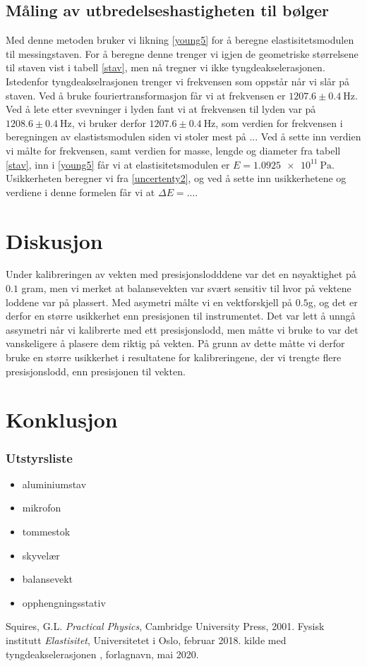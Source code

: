 \documentclass[%
 reprint,
 amsmath,amssymb,
 aps,
]{revtex4-1}
\begin{document}
\subsection{Måling av utbredelseshastigheten til bølger}
Med denne metoden bruker vi likning \eqref{young5} for å beregne elastisitetsmodulen til messingstaven. For å beregne denne trenger vi igjen de geometriske størrelsene til staven vist i tabell \vref{stav}, men nå tregner vi ikke tyngdeakselerasjonen. Istedenfor tyngdeakselrasjonen trenger vi frekvensen som oppstår når vi slår på staven. Ved å bruke fouriertransformasjon får vi at frekvensen er $1207.6\pm\SI{0.4}{\hertz}$. Ved å lete etter svevninger i lyden fant vi at frekvensen til lyden var på $1208.6\pm\SI{0.4}{\hertz}$, vi bruker derfor $1207.6\pm\SI{0.4}{\hertz}$, som verdien for frekvensen i beregningen av elastistsmodulen siden vi stoler mest på ...
Ved å sette inn verdien vi målte for frekvensen, samt verdien for masse, lengde og diameter fra tabell \vref{stav}, inn i \eqref{young5} får vi at elastisitetsmodulen er $E = \SI{1.0925e11}{\pascal}$. Usikkerheten beregner vi fra \eqref{uncertenty2}, og ved å sette inn usikkerhetene og verdiene i denne formelen får vi at $\Delta E = ...$.
\section{Diskusjon}
Under kalibreringen av vekten med presisjonslodddene var det en nøyaktighet på $0.1$ gram, men vi merket at balansevekten var svært sensitiv til hvor på vektene loddene var på plassert. Med asymetri målte vi en vektforskjell på $0.5$g, og det er derfor en større usikkerhet enn presisjonen til instrumentet. Det var lett å unngå assymetri når vi kalibrerte med ett presisjonslodd, men måtte vi bruke to var det vanskeligere å plasere dem riktig på vekten. På grunn av dette måtte vi derfor bruke en større usikkerhet i resultatene for kalibreringene, der vi trengte flere presisjonslodd, enn presisjonen til vekten.
\section{Konklusjon}
\subsubsection*{Utstyrsliste}
\begin{itemize}
\label{utstyr}
\item aluminiumstav
\item mikrofon
\item tommestok
\item skyvelær
\item balansevekt
\item opphengningsstativ
\end{itemize}
\begin{thebibliography}{9}
Squires, G.L. \emph{Practical Physics}, Cambridge University Press, 2001.
Fysisk institutt \emph{Elastisitet}, Universitetet i Oslo, februar 2018.
kilde med tyngdeakselerasjonen , forlagnavn, mai 2020.
\end{thebibliography}
\end{document}
